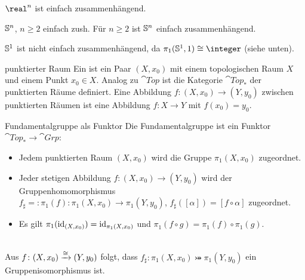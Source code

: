 \begin{Bsp}
    $\real^n$ ist einfach zusammenhängend.
\end{Bsp}

\begin{Satz}{$\mathbb{S}^n$, $n \ge 2$ einfach zush.}
    Für $n \ge 2$ ist $\mathbb{S}^n$ einfach zusammenhängend.
\end{Satz}

\begin{Bem}
    $\mathbb{S}^1$ ist nicht einfach zusammenhängend, da
    $\pi_1(\sphere^1, 1) \cong \integer$ (siehe unten).
\end{Bem}

\linie

\begin{Def}{punktierter Raum}
    Ein  ist ein Paar $(X, x_0)$ mit
    einem topologischen Raum $X$ und einem Punkt $x_0 \in X$.
    Analog zu $\cat{Top}$ ist die Kategorie $\cat{Top}_\ast$ der punktierten
    Räume definiert.
    Eine Abbildung $f\colon (X, x_0) \rightarrow (Y, y_0)$ zwischen
    punktierten Räumen ist eine Abbildung $f\colon X \rightarrow Y$ mit
    $f(x_0) = y_0$.
\end{Def}

\begin{Satz}{Fundamentalgruppe als Funktor}
    Die Fundamentalgruppe ist ein Funktor
    $\cat{Top}_\ast \rightarrow \cat{Grp}$:
    \begin{itemize}
        \item
        Jedem punktierten Raum $(X, x_0)$ wird die Gruppe $\pi_1(X, x_0)$
        zugeordnet.

        \item
        Jeder stetigen Abbildung $f\colon (X, x_0) \rightarrow (Y, y_0)$ wird
        der Gruppenhomomorphismus \\
        $f_\sharp =: \pi_1(f)\colon \pi_1(X, x_0) \rightarrow \pi_1(Y, y_0)$,
        $f_\sharp([\alpha]) = [f \circ \alpha]$ zugeordnet.

        \item
        Es gilt $\pi_1(\operatorname{id}_{(X, x_0)}) = \operatorname{id}_{\pi_1(X, x_0)}$ und
        $\pi_1(f \circ g) = \pi_1(f) \circ \pi_1(g)$.
    \end{itemize}
\end{Satz}

\begin{Kor}\\
    Aus $f\colon (X, x_0) \xrightarrow{\cong} (Y, y_0)$ folgt, dass
    $f_\sharp\colon \pi_1(X, x_0) \bij \pi_1(Y, y_0)$ ein
    Gruppenisomorphismus ist.
\end{Kor}

